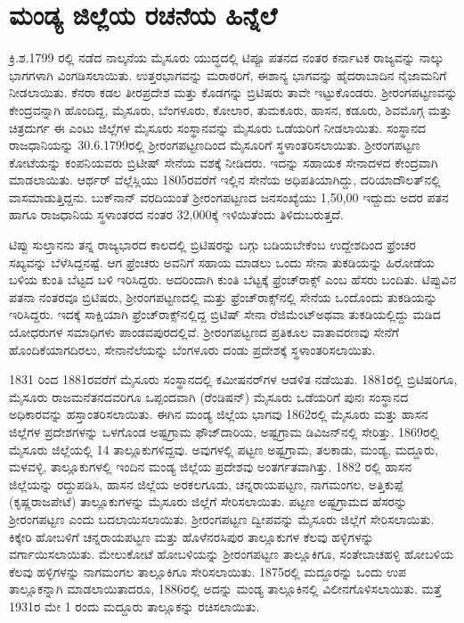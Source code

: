 \section{ಮಂಡ್ಯ ಜಿಲ್ಲೆಯ ರಚನೆಯ ಹಿನ್ನೆಲೆ}

ಕ್ರಿ.ಶ.1799 ರಲ್ಲಿ ನಡೆದ ನಾಲ್ಕನೆಯ ಮೈಸೂರು ಯುದ್ಧದಲ್ಲಿ ಟಿಪ್ಪೂ ಪತನದ ನಂತರ ಕರ್ನಾಟಕ ರಾಜ್ಯವನ್ನು ನಾಲ್ಕು ಭಾಗಗಳಾಗಿ ವಿಂಗಡಿಸಲಾಯಿತು. ಉತ್ತರಭಾಗವನ್ನು ಮರಾಠರಿಗೆ, ಈಶಾನ್ಯ ಭಾಗವನ್ನು ಹೈದರಾಬಾದಿನ ನೈಜಾಮನಿಗೆ ನೀಡಲಾಯಿತು. ಕೆನರಾ ಕಡಲ ತೀರಪ್ರದೇಶ ಮತ್ತು ಕೊಡಗನ್ನು ಬ್ರಿಟಿಷರು ತಾವೇ ಇಟ್ಟುಕೊಂಡರು. ಶ‍್ರೀರಂಗಪಟ್ಟಣವನ್ನು ಕೇಂದ್ರವನ್ನಾಗಿ ಹೊಂದಿದ್ದ, ಮೈಸೂರು, ಬೆಂಗಳೂರು, ಕೋಲಾರ, ತುಮಕೂರು, ಹಾಸನ, ಕಡೂರು, ಶಿವಮೊಗ್ಗ ಮತ್ತು ಚಿತ್ರದುರ್ಗ ಈ ಎಂಟು ಜಿಲ್ಲೆಗಳ ಮೈಸೂರು ಸಂಸ್ಥಾನವನ್ನು ಮೈಸೂರು ಒಡೆಯರಿಗೆ ನೀಡಲಾಯಿತು. ಸಂಸ್ಥಾನದ ರಾಜಧಾನಿಯನ್ನು 30.6.1799ರಲ್ಲಿ ಶ‍್ರೀರಂಗಪಟ್ಟಣದಿಂದ ಮೈಸೂರಿಗೆ ಸ್ಥಳಾಂತರಿಸಲಾಯಿತು. ಶ‍್ರೀರಂಗಪಟ್ಟಣ ಕೋಟೆಯನ್ನು ಕಂಪನಿಯವರು ಬ್ರಿಟೀಷ್​ ಸೇನೆಯ ವಶಕ್ಕೆ ನೀಡಿದರು. ಇದನ್ನು ಸಹಾಯಕ ಸೇನಾದಳದ ಕೇಂದ್ರವಾಗಿ ಮಾಡಲಾಯಿತು. ಆರ್ಥರ್​ ವೆಲ್ಲೆಸ್ಲಿಯು 1805ರವರೆಗೆ ಇಲ್ಲಿನ ಸೇನೆಯ ಅಧಿಪತಿಯಾಗಿದ್ದು, ದರಿಯಾದೌಲತ್​ನಲ್ಲಿ ವಾಸಮಾಡುತ್ತಿದ್ದನು. ಬುಕ್​ನಾನ್​ ವರದಿಯಂತೆ ಶ‍್ರೀರಂಗಪಟ್ಟಣದ ಜನಸಂಖ್ಯೆಯು 1,50,00 ಇದ್ದುದು ಅದರ ಪತನ ಹಾಗೂ ರಾಜಧಾನಿಯ ಸ್ಥಳಾಂತರದ ನಂತರ 32,000ಕ್ಕೆ ಇಳಿಯಿತೆಂದು ತಿಳಿದುಬರುತ್ತದೆ.

ಟಿಪ್ಪು ಸುಲ್ತಾನನು ತನ್ನ ರಾಜ್ಯಭಾರದ ಕಾಲದಲ್ಲಿ ಬ್ರಿಟಿಷರನ್ನು ಬಗ್ಗು ಬಡಿಯಬೇಕೆಂಬ ಉದ್ದೇಶದಿಂದ ಫ್ರೆಂಚರ ಸಖ್ಯವನ್ನು ಬೆಳೆಸಿದ್ದನಷ್ಟೆ. ಆಗ ಫ್ರೆಂಚರು ಅವನಿಗೆ ಸಹಾಯ ಮಾಡಲು ಒಂದು ಸೇನಾ ತುಕಡಿಯನ್ನು ಹಿರೋಡೆಯ ಬಳಿಯ ಕುಂತಿ ಬೆಟ್ಟದ ಬಳಿ ಇರಿಸಿದ್ದರು. ಅದರಿಂದಾಗಿ ಕುಂತಿ ಬೆಟ್ಟಕ್ಕೆ ಫ್ರೆಂಚ್​ರಾಕ್ಸ್​ ಎಂಬ ಹೆಸರು ಬಂದಿತು. ಟಿಪ್ಪುವಿನ ಪತನಾ ನಂತರವೂ ಬ್ರಿಟಿಷರು, ಶ‍್ರೀರಂಗಪಟ್ಟಣದಲ್ಲಿ ಮತ್ತು ಫ್ರೆಂಚ್​ರಾಕ್ಸ್​ನಲ್ಲಿ ಸೇನೆಯ ಒಂದೊಂದು ತುಕಡಿಯನ್ನು ಇರಿಸಿದ್ದರು. ಇದಕ್ಕೆ ಸಾಕ್ಷಿಯಾಗಿ ಫ್ರೆಂಚ್​ರಾಕ್ಸ್​ನಲ್ಲಿದ್ದ ಬ್ರಿಟಿಷ್​ ಸೇನಾ ರೆಜಿಮೆಂಟ್​ ಅಥವಾ ತುಕಡಿಯಲ್ಲಿದ್ದು ಮಡಿದ ಯೋಧರುಗಳ ಸಮಾಧಿಗಳು ಪಾಂಡವಪುರದಲ್ಲಿವೆ. ಶ‍್ರೀರಂಗಪಟ್ಟಣದ ಪ್ರತಿಕೂಲ ವಾತಾವರಣವು ಸೇನೆಗೆ ಹೊಂದಿಕೆಯಾಗದಿರಲು, ಸೇನಾನೆಲೆಯನ್ನು ಬೆಂಗಳೂರು ದಂಡು ಪ್ರದೇಶಕ್ಕೆ ಸ್ಥಳಾಂತರಿಸಲಾಯಿತು.

1831 ರಿಂದ 1881ರವರೆಗೆ ಮೈಸೂರು ಸಂಸ್ಥಾನದಲ್ಲಿ ಕಮೀಷನರ್​ಗಳ ಆಡಳಿತ ನಡೆಯಿತು. 1881ರಲ್ಲಿ ಬ್ರಿಟಿಷರಿಗೂ, ಮೈಸೂರು ರಾಜಮನೆತನದವರಿಗೂ ಒಪ್ಪಂದವಾಗಿ (ರೆಂಡಿಷನ್​) ಮೈಸೂರು ಒಡೆಯರಿಗೆ ಪುನಃ ಸಂಸ್ಥಾನದ ಅಧಿಕಾರವನ್ನು ಹಸ್ತಾಂತರಿಸಲಾಯಿತು. ಈಗಿನ ಮಂಡ್ಯ ಜಿಲ್ಲೆಯ ಭಾಗವು 1862ರಲ್ಲಿ ಮೈಸೂರು ಮತ್ತು ಹಾಸನ ಜಿಲ್ಲೆಗಳ ಪ್ರದೇಶಗಳನ್ನು ಒಳಗೊಂಡ ಅಷ್ಟಗ್ರಾಮ ಫೌಜ್​ದಾರಿಯ, ಅಷ್ಟಗ್ರಾಮ ಡಿವಿಜನ್​ನಲ್ಲಿ ಸೇರಿತ್ತು. 1869ರಲ್ಲಿ ಮೈಸೂರು ಜಿಲ್ಲೆಯಲ್ಲಿ 14 ತಾಲ್ಲೂಕುಗಳಿದ್ದವು. ಅವುಗಳಲ್ಲಿ ಪಟ್ಟಣ ಅಷ್ಟಗ್ರಾಮ, ತಲಕಾಡು, ಮಂಡ್ಯ, ಮದ್ದೂರು, ಮಳವಳ್ಳಿ, ತಾಲ್ಲೂಕುಗಳಲ್ಲಿ ಇಂದಿನ ಮಂಡ್ಯ ಜಿಲ್ಲೆಯ ಪ್ರದೇಶವು ಅಂತರ್ಗತವಾಗಿತ್ತು. 1882 ರಲ್ಲಿ ಹಾಸನ ಜಿಲ್ಲೆಯನ್ನು ರದ್ದುಪಡಿಸಿ, ಹಾಸನ ಜಿಲ್ಲೆಯ ಅರಕಲಗೂಡು, ಚನ್ನರಾಯಪಟ್ಟಣ, ನಾಗಮಂಗಲ, ಅತ್ತಿಕುಪ್ಪೆ (ಕೃಷ್ಣರಾಜಪೇಟೆ) ತಾಲ್ಲೂಕುಗಳನ್ನು ಮೈಸೂರು ಜಿಲ್ಲೆಗೆ ಸೇರಿಸಲಾಯಿತು. ಪಟ್ಟಣ ಅಷ್ಟಗ್ರಾಮದ ಹೆಸರನ್ನು ಶ‍್ರೀರಂಗಪಟ್ಟಣ ಎಂದು ಬದಲಾಯಿಸಲಾಯಿತು. ಶ‍್ರೀರಂಗಪಟ್ಟಣ ದ್ವೀಪವನ್ನು ಮೈಸೂರು ಜಿಲ್ಲೆಗೆ ಸೇರಿಸಲಾಯಿತು. ಕಿಕ್ಕೇರಿ ಹೋಬಳಿಗೆ ಚನ್ನರಾಯಪಟ್ಟಣ ಮತ್ತು ಹೊಳೆನರಸಿಪುರ ತಾಲ್ಲೂಕುಗಳ ಕೆಲವು ಹಳ್ಳಿಗಳನ್ನು ವರ್ಗಾಯಿಸಲಾಯಿತು. ಮೇಲುಕೋಟೆ ಹೋಬಳಿಯನ್ನು ಶ‍್ರೀರಂಗಪಟ್ಟಣ ತಾಲ್ಲೂಕಿಗೂ, ಸಂತೇಬಾಚಹಳ್ಳಿ ಹೋಬಳಿಯ ಕೆಲವು ಹಳ್ಳಿಗಳನ್ನು ನಾಗಮಂಗಲ ತಾಲ್ಲೂಕಿಗೂ ಸೇರಿಸಲಾಯಿತು. 1875ರಲ್ಲಿ ಮದ್ದೂರನ್ನು ಒಂದು ಉಪ ತಾಲ್ಲೂಕನ್ನಾಗಿ ಮಾಡಲಾಯಿತಾದರೂ, 1886ರಲ್ಲಿ ಅದನ್ನು ಮಂಡ್ಯ ತಾಲ್ಲೂಕಿನಲ್ಲಿ ವಿಲೀನಗೊಳಿಸಲಾಯಿತು. ಮತ್ತೆ 1931ರ ಮೇ 1 ರಂದು ಮದ್ದೂರು ತಾಲ್ಲೂಕನ್ನು ರಚಿಸಲಾಯಿತು.

